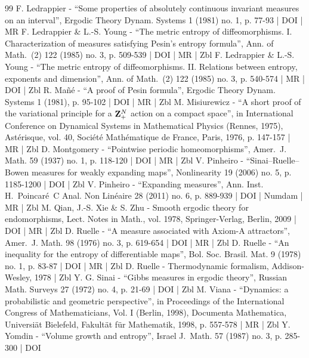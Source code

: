 \begin{thebibliography}{99}
F. Ledrappier - “Some properties of absolutely continuous invariant measures on an interval”, Ergodic Theory Dynam. Systems 1 (1981) no. 1, p. 77-93 | DOI | MR
F. Ledrappier \& L.-S. Young - “The metric entropy of diffeomorphisms. I. Characterization of measures satisfying Pesin’s entropy formula”, Ann. of Math. (2) 122 (1985) no. 3, p. 509-539 | DOI | MR | Zbl
F. Ledrappier \& L.-S. Young - “The metric entropy of diffeomorphisms. II. Relations between entropy, exponents and dimension”, Ann. of Math. (2) 122 (1985) no. 3, p. 540-574 | MR | DOI | Zbl
R. Mañé - “A proof of Pesin formula”, Ergodic Theory Dynam. Systems 1 (1981), p. 95-102 | DOI | MR | Zbl
M. Misiurewicz - “A short proof of the variational principle for a ${\bf Z}_{+}^{N}$ action on a compact space”, in International Conference on Dynamical Systems in Mathematical Physics (Rennes, 1975), Astérisque, vol. 40, Société Mathématique de France, Paris, 1976, p. 147-157 | MR | Zbl
D. Montgomery - “Pointwise periodic homeomorphisms”, Amer. J. Math. 59 (1937) no. 1, p. 118-120 | DOI | MR | Zbl
V. Pinheiro - “Sinai–Ruelle–Bowen measures for weakly expanding maps”, Nonlinearity 19 (2006) no. 5, p. 1185-1200 | DOI | Zbl
V. Pinheiro - “Expanding measures”, Ann. Inst. H. Poincaré C Anal. Non Linéaire 28 (2011) no. 6, p. 889-939 | DOI | Numdam | MR | Zbl
M. Qian, J.-S. Xie \& S. Zhu - Smooth ergodic theory for endomorphisms, Lect. Notes in Math., vol. 1978, Springer-Verlag, Berlin, 2009 | DOI | MR | Zbl
D. Ruelle - “A measure associated with Axiom-A attractors”, Amer. J. Math. 98 (1976) no. 3, p. 619-654 | DOI | MR | Zbl
D. Ruelle - “An inequality for the entropy of differentiable maps”, Bol. Soc. Brasil. Mat. 9 (1978) no. 1, p. 83-87 | DOI | MR | Zbl
D. Ruelle - Thermodynamic formalism, Addison-Wesley, 1978 | Zbl
Y. G. Sinai - “Gibbs measures in ergodic theory”, Russian Math. Surveys 27 (1972) no. 4, p. 21-69 | DOI | Zbl
M. Viana - “Dynamics: a probabilistic and geometric perspective”, in Proceedings of the International Congress of Mathematicians, Vol. I (Berlin, 1998), Documenta Mathematica, Universiät Bielefeld, Fakultät für Mathematik, 1998, p. 557-578 | MR | Zbl
Y. Yomdin - “Volume growth and entropy”, Israel J. Math. 57 (1987) no. 3, p. 285-300 | DOI
\end{thebibliography}
